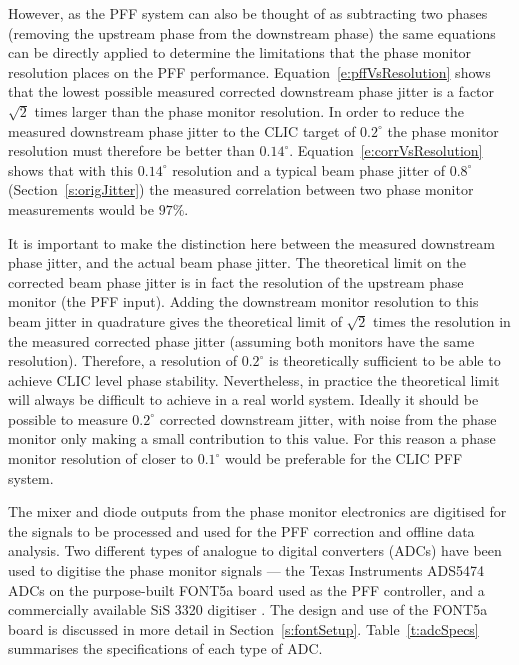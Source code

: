 However, as the PFF system can also be thought of as subtracting two phases (removing the upstream phase from the downstream phase) the same equations can be directly applied to determine the limitations that the phase monitor resolution places on the PFF performance. Equation~\ref{e:pffVsResolution} shows that the lowest possible measured corrected downstream phase jitter is a factor \(\sqrt{2}\) times larger than the phase monitor resolution. In order to reduce the measured downstream phase jitter to the CLIC target of \(0.2^\circ\) the phase monitor resolution must therefore be better than \(0.14^\circ\). Equation~\ref{e:corrVsResolution} shows that with this \(0.14^\circ\) resolution and a typical beam phase jitter of \(0.8^\circ\) (Section~\ref{s:origJitter}) the measured correlation between two phase monitor measurements would be \(97\%\).

It is important to make the distinction here between the measured downstream phase jitter, and the actual beam phase jitter. The theoretical limit on the corrected beam phase jitter is in fact the resolution of the upstream phase monitor (the PFF input). Adding the downstream monitor resolution to this beam jitter in quadrature gives the theoretical limit of \(\sqrt{2}\) times the resolution in the measured corrected phase jitter (assuming both monitors have the same resolution). Therefore, a resolution of \(0.2^\circ\) is theoretically sufficient to be able to achieve CLIC level phase stability. Nevertheless, in practice the theoretical limit will always be difficult to achieve in a real world system. Ideally it should be possible to measure \(0.2^\circ\) corrected downstream jitter, with noise from the phase monitor only making a small contribution to this value. For this reason a phase monitor resolution of closer to \(0.1^\circ\) would be preferable for the CLIC PFF system.


The mixer and diode outputs from the phase monitor electronics are digitised for the signals to be processed and used for the PFF correction and offline data analysis. Two different types of analogue to digital converters (ADCs) have been used to digitise the phase monitor signals --- the Texas Instruments ADS5474 ADCs \cite{fontADCs} on the purpose-built FONT5a board used as the PFF controller, and a commercially available SiS 3320 digitiser \cite{sisDigi}. The design and use of the FONT5a board is discussed in more detail in Section~\ref{s:fontSetup}. Table~\ref{t:adcSpecs} summarises the specifications of each type of ADC. 

